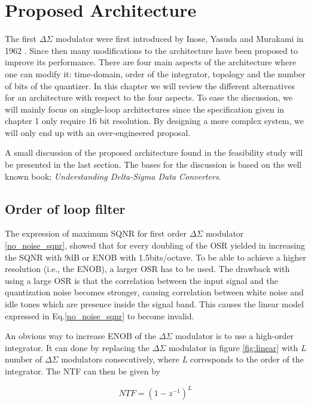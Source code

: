 \chapter{Proposed Architecture}\label{architecture}

The first $\Delta\Sigma$ modulator were first introduced by Inose, Yasuda and Murakami in 1962 \cite{first_delta}. Since then many modifications to the architecture have been proposed to improve its performance. There are four main aspects of the architecture where one can modify it: time-domain, order of the integrator, topology and the number of bits of the quantizer. In this chapter we will review the different alternatives for an architecture with respect to the four aspects. To ease the discussion, we will mainly focus on single-loop architectures since the specification given in chapter 1 only require 16 bit resolution. By designing a more complex system, we will only end up with an over-engineered proposal. 

A small discussion of the proposed architecture found in the feasibility study will be presented in the last section. The bases for the discussion is based on the well known book; \textit{Understanding Delta-Sigma Data Converters}\cite{Richard}. 

\section{Order of loop filter}

The expression of maximum SQNR for first order $\Delta\Sigma$ modulator \ref{no_noise_sqnr}, showed that for every doubling of the OSR yielded in increasing the SQNR with 9dB or ENOB with 1.5bits/octave. To be able to achieve a higher resolution (i.e., the ENOB), a larger OSR has to be used. The drawback with using a large OSR is that the correlation between the input signal and the quantization noise becomes stronger, causing correlation between white noise and idle tones which are presence inside the signal band. This causes the linear model expressed in Eq.\ref{no_noise_sqnr} to become invalid.

An obvious way to increase ENOB of the $\Delta\Sigma$ modulator is to use a high-order integrator. It can done by replacing the $\Delta\Sigma$ modulator in figure \ref{fig:linear} with \textit{L} number of $\Delta\Sigma$ modulators consecutively, where \textit{L} corresponds to the order of the integrator. The NTF can then be given by

\begin{equation}
    NTF = (1-z^{-1})^L
\end{equation}

